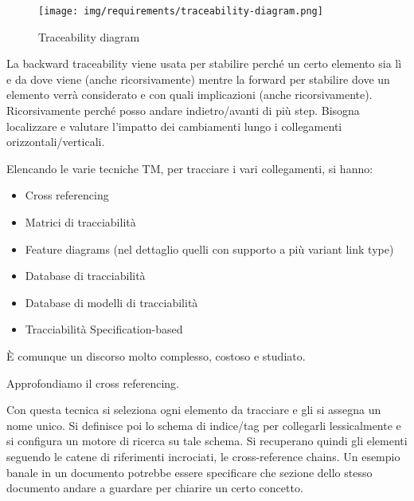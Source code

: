 \begin{figure}[!ht]
      \centering
      \texttt{[image: img/requirements/traceability-diagram.png]}
      \caption{Traceability diagram}
      \label{fig:traceability-diagram}
\end{figure}

La backward traceability viene usata per stabilire perché un certo elemento sia
lì e da dove viene (anche ricorsivamente) mentre la forward per stabilire dove un
elemento verrà considerato e con quali implicazioni (anche ricorsivamente).
Ricorsivamente perché posso andare indietro/avanti di più step. Bisogna localizzare
e valutare l'impatto dei cambiamenti lungo i collegamenti orizzontali/verticali.

Elencando le varie tecniche TM, per tracciare i vari collegamenti, si hanno:
\begin{itemize}
      \item Cross referencing
      \item Matrici di tracciabilità
      \item Feature diagrams (nel dettaglio quelli con supporto a più variant link
            type)
      \item Database di tracciabilità
      \item Database di modelli di tracciabilità
      \item Tracciabilità Specification-based
\end{itemize}
È comunque un discorso molto complesso, costoso e studiato.

Approfondiamo il cross referencing.

Con questa tecnica si seleziona ogni elemento da tracciare e gli si assegna un
nome unico. Si definisce poi lo schema di indice/tag per collegarli lessicalmente e
si configura un motore di ricerca su tale schema. Si recuperano quindi gli elementi
seguendo le catene di riferimenti incrociati, le cross-reference chains. Un esempio
banale in un documento potrebbe essere specificare che sezione dello stesso documento
andare a guardare per chiarire un certo concetto.

